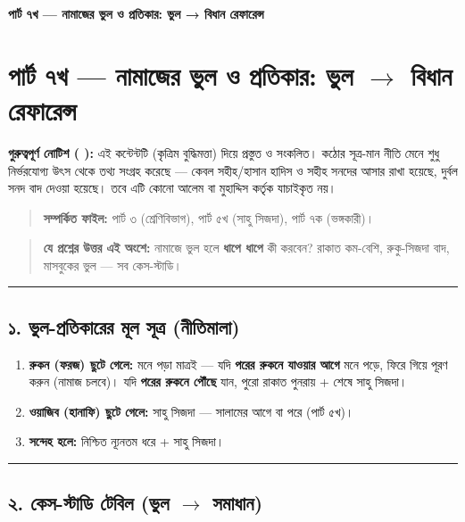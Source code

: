 

\begin{center}{\Large\bfseries\color{emerald} পার্ট ৭খ — নামাজের ভুল ও প্রতিকার: ভুল → বিধান রেফারেন্স}\end{center}
\vspace{1em}
\section*{পার্ট ৭খ — নামাজের ভুল ও প্রতিকার: ভুল $\rightarrow$ বিধান রেফারেন্স}

\begin{warnbox}
 \textbf{গুরুত্বপূর্ণ নোটিশ ( ):} এই কন্টেন্টটি  (কৃত্রিম বুদ্ধিমত্তা) দিয়ে প্রস্তুত ও সংকলিত।  কঠোর সূত্র-মান নীতি মেনে শুধু নির্ভরযোগ্য উৎস থেকে তথ্য সংগ্রহ করেছে — কেবল সহীহ/হাসান হাদিস ও সহীহ সনদের আসার রাখা হয়েছে, দুর্বল সনদ বাদ দেওয়া হয়েছে। তবে এটি কোনো আলেম বা মুহাদ্দিস কর্তৃক যাচাইকৃত নয়।
\end{warnbox}

\begin{quote}
\textbf{সম্পর্কিত ফাইল:} পার্ট ৩ (শ্রেণিবিভাগ), পার্ট ৫খ (সাহু সিজদা), পার্ট ৭ক (ভঙ্গকারী)।
\end{quote}

\begin{quote}
\textbf{যে প্রশ্নের উত্তর এই অংশে:} নামাজে ভুল হলে \textbf{ধাপে ধাপে} কী করবেন? রাকাত কম-বেশি, রুকু-সিজদা বাদ, মাসবুকের ভুল — সব কেস-স্টাডি।
\end{quote}

\medskip\hrule\medskip

\subsection*{১. ভুল-প্রতিকারের মূল সূত্র (নীতিমালা)}

\begin{enumerate}
\item \textbf{রুকন (ফরজ) ছুটে গেলে:} মনে পড়া মাত্রই — যদি \textbf{পরের রুকনে যাওয়ার আগে} মনে পড়ে, ফিরে গিয়ে পূরণ করুন (নামাজ চলবে)। যদি \textbf{পরের রুকনে পৌঁছে} যান, পুরো রাকাত পুনরায় + শেষে সাহু সিজদা।
\item \textbf{ওয়াজিব (হানাফি) ছুটে গেলে:} সাহু সিজদা — সালামের আগে বা পরে (পার্ট ৫খ)।
\item \textbf{সন্দেহ হলে:} নিশ্চিত ন্যূনতম ধরে + সাহু সিজদা।
\end{enumerate}
\medskip\hrule\medskip

\subsection*{২. কেস-স্টাডি টেবিল (ভুল $\rightarrow$ সমাধান)}

